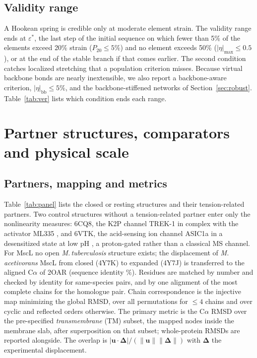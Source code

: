 \documentclass[preprint,12pt,a4paper]{elsarticle}
\newcommand{\eps}{\varepsilon}
\begin{document}
\subsection{Validity range}
\label{sec:validity}
A Hookean spring is credible only at moderate element strain. The validity range ends at $\eps^*$, the last step of the initial sequence on which fewer than 5\% of the elements exceed 20\% strain ($P_{20}\le5\%$) and no element exceeds 50\% ($|\eta|_{\max}\le0.5$), or at the end of the stable branch if that comes earlier. The second condition catches localized stretching that a population criterion misses. Because virtual backbone bonds are nearly inextensible, we also report a backbone-aware criterion, $|\eta|_{\mathrm{bb}}\le5\%$, and the backbone-stiffened networks of Section~\ref{sec:robust}. Table~\ref{tab:ver} lists which condition ends each range.

\section{Partner structures, comparators and physical scale}
\label{sec:val}
\subsection{Partners, mapping and metrics}
Table~\ref{tab:panel} lists the closed or resting structures and their tension-related partners. Two control structures without a tension-related partner enter only the nonlinearity measures: 6CQ8, the K2P channel TREK-1 in complex with the activator ML335 \citep{lolicato2017}, and 6VTK, the acid-sensing ion channel ASIC1a in a desensitized state at low pH \citep{yoder2020}, a proton-gated rather than a classical MS channel. For MscL no open \textit{M.\,tuberculosis} structure exists; the displacement of \textit{M.\,acetivorans} MscL from closed (4Y7K) to expanded (4Y7J) \citep{li2015} is transferred to the aligned C$\alpha$ of 2OAR \citep{steinbacher2007} (sequence identity \%). Residues are matched by number and checked by identity for same-species pairs, and by one alignment of the most complete chains for the homologue pair. Chain correspondence is the injective map minimizing the global RMSD, over all permutations for $\le4$ chains and over cyclic and reflected orders otherwise. The primary metric is the C$\alpha$ RMSD over the pre-specified \emph{transmembrane} (TM) subset, the mapped nodes inside the membrane slab, after superposition on that subset; whole-protein RMSDs are reported alongside. The overlap is $|\mathbf{u}\cdot\bm\Delta|/(\|\mathbf{u}\|\|\bm\Delta\|)$ with $\bm\Delta$ the experimental displacement.
\end{document}
